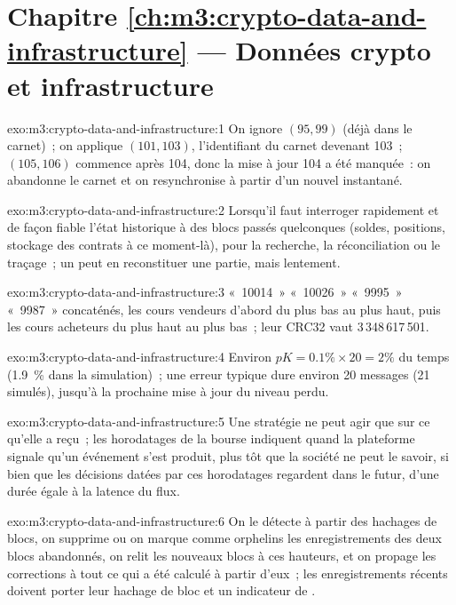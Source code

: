 \section*{Chapitre \ref{ch:m3:crypto-data-and-infrastructure} --- Données crypto et infrastructure}

\begin{solution}{exo:m3:crypto-data-and-infrastructure:1}
On ignore $(95, 99)$ (déjà dans le carnet)~; on applique $(101, 103)$, l'identifiant du carnet devenant 103~; $(105, 106)$ commence après 104, donc la mise à jour 104 a été manquée~:
on abandonne le carnet et on resynchronise à partir d'un nouvel instantané.
\end{solution}

\begin{solution}{exo:m3:crypto-data-and-infrastructure:2}
Lorsqu'il faut interroger rapidement et de façon fiable l'état historique à des blocs passés quelconques (soldes, positions, stockage des contrats à ce moment-là), pour la recherche,
la réconciliation ou le traçage~; un  peut en reconstituer une partie, mais lentement.
\end{solution}

\begin{solution}{exo:m3:crypto-data-and-infrastructure:3}
«~10014~» «~10026~» «~9995~» «~9987~» concaténés, les cours vendeurs d'abord du plus bas au plus haut, puis les cours acheteurs du plus haut au plus bas~; leur CRC32 vaut 3\,348\,617\,501.
\end{solution}

\begin{solution}{exo:m3:crypto-data-and-infrastructure:4}
Environ $pK = 0.1\% \times 20 = 2\%$ du temps (1.9~\% dans la simulation)~; une erreur typique dure environ 20 messages (21 simulés), jusqu'à
la prochaine mise à jour du niveau perdu.
\end{solution}

\begin{solution}{exo:m3:crypto-data-and-infrastructure:5}
Une stratégie ne peut agir que sur ce qu'elle a reçu~; les horodatages de la bourse indiquent quand la plateforme signale qu'un événement s'est produit, plus tôt que la société ne peut le savoir,
si bien que les décisions datées par ces horodatages regardent dans le futur, d'une durée égale à la latence du flux.
\end{solution}

\begin{solution}{exo:m3:crypto-data-and-infrastructure:6}
On le détecte à partir des hachages de blocs, on supprime ou on marque comme orphelins les enregistrements des deux blocs abandonnés, on relit les nouveaux blocs à ces hauteurs, et
on propage les corrections à tout ce qui a été calculé à partir d'eux~; les enregistrements récents doivent porter leur hachage de bloc et un indicateur de .
\end{solution}

